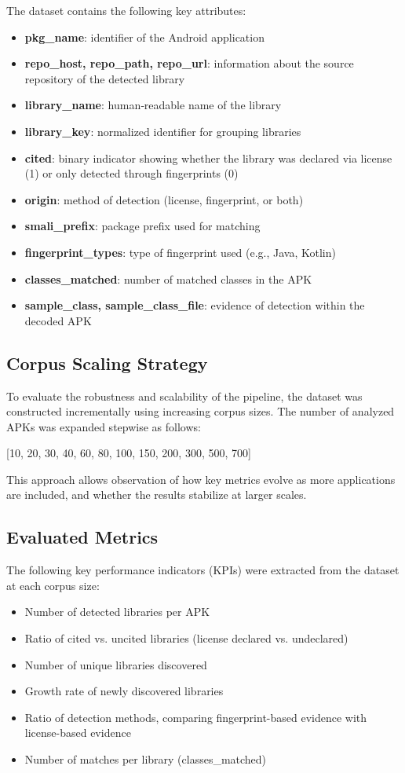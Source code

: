 \documentclass[12pt,a4paper]{report}
\begin{document}
The dataset contains the following key attributes:
\begin{itemize}
\item \textbf{pkg\_name}: identifier of the Android application
\item \textbf{repo\_host, repo\_path, repo\_url}: information about the source repository of the detected library
\item \textbf{library\_name}: human‑readable name of the library
\item \textbf{library\_key}: normalized identifier for grouping libraries
\item \textbf{cited}: binary indicator showing whether the library was declared via license (1) or only detected through fingerprints (0)
\item \textbf{origin}: method of detection (license, fingerprint, or both)
\item \textbf{smali\_prefix}: package prefix used for matching
\item \textbf{fingerprint\_types}: type of fingerprint used (e.g., Java, Kotlin)
\item \textbf{classes\_matched}: number of matched classes in the APK
\item \textbf{sample\_class, sample\_class\_file}: evidence of detection within the decoded APK
\end{itemize}

\subsection{Corpus Scaling Strategy}
To evaluate the robustness and scalability of the pipeline, the dataset was constructed incrementally using increasing corpus sizes. The number of analyzed APKs was expanded stepwise as follows:

\begin{center}
[10, 20, 30, 40, 60, 80, 100, 150, 200, 300, 500, 700]
\end{center}

This approach allows observation of how key metrics evolve as more applications are included, and whether the results stabilize at larger scales.

\subsection{Evaluated Metrics}
The following key performance indicators (KPIs) were extracted from the dataset at each corpus size:

\begin{itemize}
\item Number of detected libraries per APK
\item Ratio of cited vs. uncited libraries (license declared vs. undeclared)
\item Number of unique libraries discovered
\item Growth rate of newly discovered libraries
\item Ratio of detection methods, comparing fingerprint-based evidence with license-based evidence
\item Number of matches per library (classes\_matched)
\end{itemize}
\end{document}
